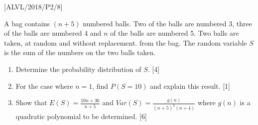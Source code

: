 \item {[}ALVL/2018/P2/8{]}

A bag contains $\left(n+5\right)$ numbered balls. Two of the balls
are numbered 3, three of the balls are numbered 4 and $n$ of the
balls are numbered 5. Two balls are taken, at random and without replacement.
from the bag. The random variable $S$ is the sum of the numbers on
the two balls taken.
\begin{enumerate}
\item Determine the probability distribution of $S$. \hfill{}{[}4{]}
\item For the case where $n=1$, find $P\left(S=10\right)$ and explain
this result.\hfill{} {[}1{]}
\item Show that $E\left(S\right)=\frac{10n+36}{n+5}$ and $Var\left(S\right)=\frac{g\left(n\right)}{\left(n+5\right)^{2}\left(n+4\right)}$
where $g\left(n\right)$ is a quadratic polynomial to be determined.\hfill{}
{[}6{]}
\end{enumerate}
